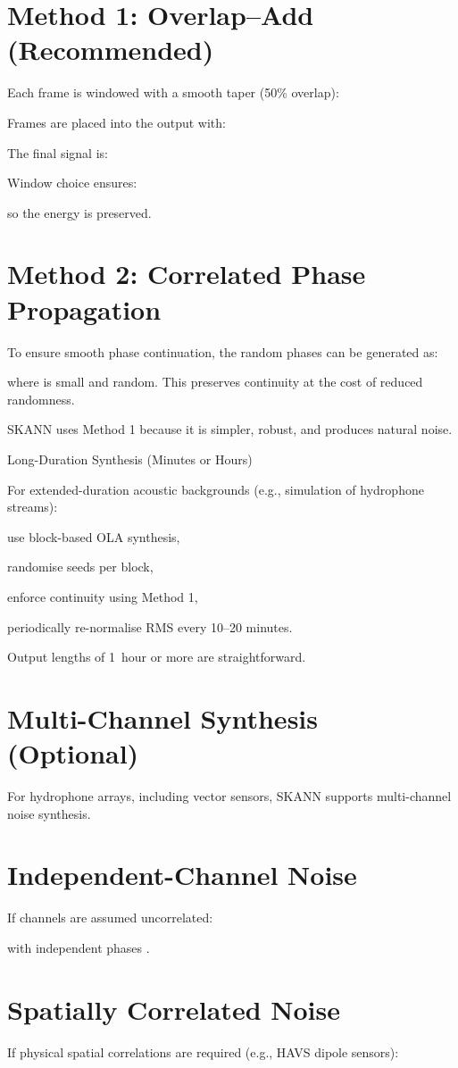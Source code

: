 \documentclass[12pt]{article}
\begin{document}
\section*{Method 1: Overlap–Add (Recommended)}
Each frame is windowed with a smooth taper (50\% overlap):


Frames are placed into the output with:


The final signal is:


Window choice ensures:


so the energy is preserved.

\section*{Method 2: Correlated Phase Propagation}
To ensure smooth phase continuation, the random phases can be generated as:


where  is small and random. This preserves continuity at the cost of reduced randomness.

SKANN uses Method 1 because it is simpler, robust, and produces natural noise.

Long-Duration Synthesis (Minutes or Hours)

For extended-duration acoustic backgrounds (e.g., simulation of hydrophone streams):

use block-based OLA synthesis,

randomise seeds per block,

enforce continuity using Method 1,

periodically re-normalise RMS every 10–20 minutes.

Output lengths of 1 hour or more are straightforward.

\section*{Multi-Channel Synthesis (Optional)}
For hydrophone arrays, including vector sensors, SKANN supports multi-channel noise synthesis.

\section*{Independent-Channel Noise}
If channels are assumed uncorrelated:


with independent phases .

\section*{Spatially Correlated Noise}
If physical spatial correlations are required (e.g., HAVS dipole sensors):
\end{document}

